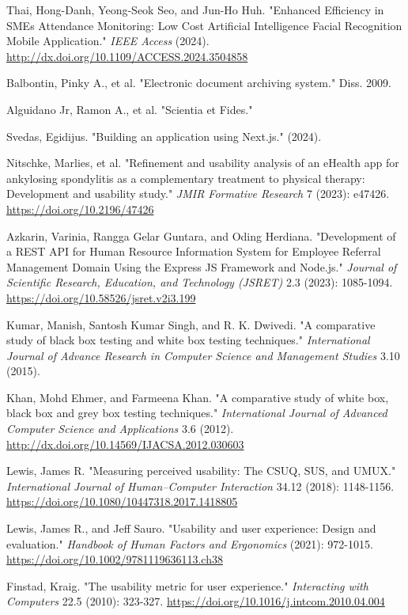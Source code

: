 \documentclass[conference,a4paper]{IEEEtran}
\begin{document}
\begin{thebibliography}{00}
   Thai, Hong-Danh, Yeong-Seok Seo, and Jun-Ho Huh. "Enhanced Efficiency in SMEs Attendance Monitoring: Low Cost Artificial Intelligence Facial Recognition Mobile Application." \textit{IEEE Access} (2024). \href{http://dx.doi.org/10.1109/ACCESS.2024.3504858}{http://dx.doi.org/10.1109/ACCESS.2024.3504858}

   Balbontin, Pinky A., et al. "Electronic document archiving system." Diss. 2009.

   Alguidano Jr, Ramon A., et al. "Scientia et Fides."

   Svedas, Egidijus. "Building an application using Next.js." (2024).

   Nitschke, Marlies, et al. "Refinement and usability analysis of an eHealth app for ankylosing spondylitis as a complementary treatment to physical therapy: Development and usability study." \textit{JMIR Formative Research} 7 (2023): e47426. \href{https://doi.org/10.2196/47426}{https://doi.org/10.2196/47426}

   Azkarin, Varinia, Rangga Gelar Guntara, and Oding Herdiana. "Development of a REST API for Human Resource Information System for Employee Referral Management Domain Using the Express JS Framework and Node.js." \textit{Journal of Scientific Research, Education, and Technology (JSRET)} 2.3 (2023): 1085-1094. \href {https://doi.org/10.58526/jsret.v2i3.199}{https://doi.org/10.58526/jsret.v2i3.199}

   Kumar, Manish, Santosh Kumar Singh, and R. K. Dwivedi. "A comparative study of black box testing and white box testing techniques." \textit{International Journal of Advance Research in Computer Science and Management Studies} 3.10 (2015).

   Khan, Mohd Ehmer, and Farmeena Khan. "A comparative study of white box, black box and grey box testing techniques." \textit{International Journal of Advanced Computer Science and Applications} 3.6 (2012). \href{http://dx.doi.org/10.14569/IJACSA.2012.030603}{http://dx.doi.org/10.14569/IJACSA.2012.030603}

   Lewis, James R. "Measuring perceived usability: The CSUQ, SUS, and UMUX." \textit{International Journal of Human–Computer Interaction} 34.12 (2018): 1148-1156. \href{https://doi.org/10.1080/10447318.2017.1418805}{https://doi.org/10.1080/10447318.2017.1418805}

   Lewis, James R., and Jeff Sauro. "Usability and user experience: Design and evaluation." \textit{Handbook of Human Factors and Ergonomics} (2021): 972-1015. \href{https://doi.org/10.1002/9781119636113.ch38}{https://doi.org/10.1002/9781119636113.ch38}

   Finstad, Kraig. "The usability metric for user experience." \textit{Interacting with Computers} 22.5 (2010): 323-327. \href{https://doi.org/10.1016/j.intcom.2010.04.004}{https://doi.org/10.1016/j.intcom.2010.04.004}

\end{thebibliography}
\end{document}

